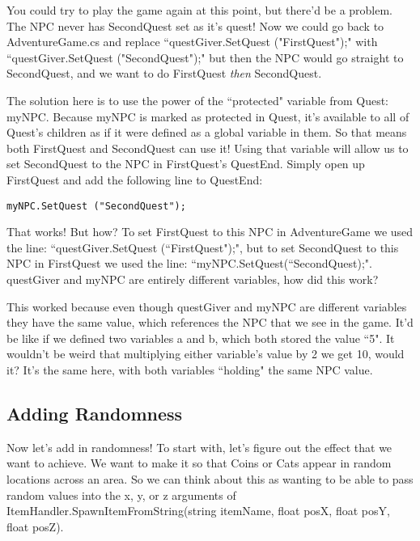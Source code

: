 \documentclass{article}
\begin{document}
You could try to play the game again at this point, but there'd be a problem. The NPC never has SecondQuest set as it's quest! Now we could go back to AdventureGame.cs and replace ``questGiver.SetQuest ("FirstQuest");" with ``questGiver.SetQuest ("SecondQuest");" but then the NPC would go straight to SecondQuest, and we want to do FirstQuest \textit{then} SecondQuest.

The solution here is to use the power of the ``protected" variable from Quest: myNPC. Because myNPC is marked as protected in Quest, it's available to all of Quest's children as if it were defined as a global variable in them. So that means both FirstQuest and SecondQuest can use it! Using that variable will allow us to set SecondQuest to the NPC in FirstQuest's QuestEnd. Simply open up FirstQuest and add the following line to QuestEnd: 

\lstset{style=sharpc}
\begin{lstlisting}
myNPC.SetQuest ("SecondQuest");
\end{lstlisting}

\noindent{}

That works! But how? To set FirstQuest to this NPC in AdventureGame we used the line: ``questGiver.SetQuest (``FirstQuest");", but to set SecondQuest to this NPC in FirstQuest we used the line: ``myNPC.SetQuest(``SecondQuest);". questGiver and myNPC are entirely different variables, how did this work? 

This worked because even though questGiver and myNPC are different variables they have the same value, which references the NPC that we see in the game. It'd be like if we defined two variables a and b, which both stored the value ``5". It wouldn't be weird that multiplying either variable's value by 2 we get 10, would it? It's the same here, with both variables ``holding" the same NPC value.

\subsection{Adding Randomness}

Now let's add in randomness! To start with, let's figure out the effect that we want to achieve. We want to make it so that Coins or Cats appear in random locations across an area. So we can think about this as wanting to be able to pass random values into the x, y, or z arguments of ItemHandler.SpawnItemFromString(string itemName, float posX, float posY, float posZ). 
\end{document}
